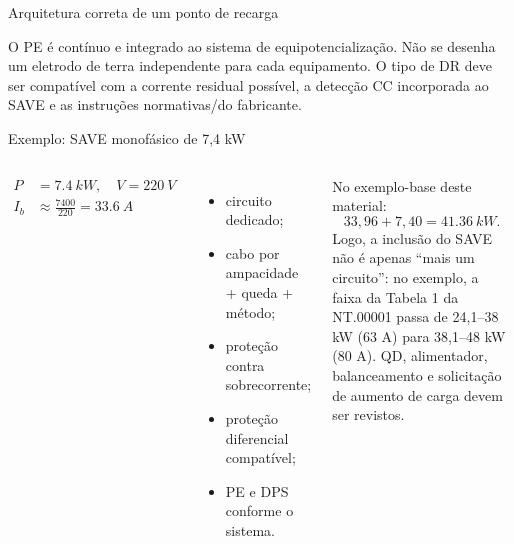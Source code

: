 \begin{frame}{Arquitetura correta de um ponto de recarga}
\small
\centering
{}
\vspace{2mm}
\begin{caixaAt}
O PE é contínuo e integrado ao sistema de equipotencialização. Não se desenha um eletrodo de terra independente para cada equipamento. O tipo de DR deve ser compatível com a corrente residual possível, a detecção CC incorporada ao SAVE e as instruções normativas/do fabricante.
\end{caixaAt}
\end{frame}

\begin{frame}{Exemplo: SAVE monofásico de 7,4 kW}
\small
\begin{columns}[T,onlytextwidth]
\begin{align*}
P&=\SI{7.4}{kW},\quad V=\SI{220}{V}\\
I_b&\approx\frac{7400}{220}=\SI{33.6}{A}
\end{align*}
\begin{itemize}
\item circuito dedicado;
\item cabo por ampacidade + queda + método;
\item proteção contra sobrecorrente;
\item proteção diferencial compatível;
\item PE e DPS conforme o sistema.
\end{itemize}
\begin{caixaProjeto}[title=Impacto no projeto residencial]
No exemplo-base deste material:
\[
33{,}96+7{,}40=\SI{41.36}{kW}.
\]
Logo, a inclusão do SAVE não é apenas ``mais um circuito'': no exemplo, a faixa da Tabela 1 da NT.00001 passa de 24,1--38 kW (63 A) para 38,1--48 kW (80 A). QD, alimentador, balanceamento e solicitação de aumento de carga devem ser revistos.
\end{caixaProjeto}
\end{columns}
\end{frame}

